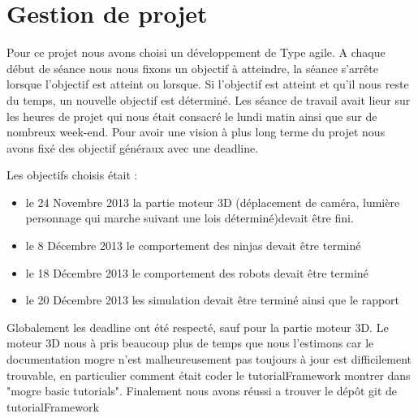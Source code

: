 \section{Gestion de projet}
\thispagestyle{fancy}
Pour ce projet nous avons choisi un développement de Type agile. A chaque début de séance nous nous fixons un objectif à atteindre, la séance s'arrête lorsque l'objectif est atteint ou lorsque. Si l'objectif est atteint et qu'il nous reste du temps, un nouvelle objectif est déterminé. Les séance de travail avait lieur sur les heures de projet qui nous était consacré le lundi matin ainsi que sur de nombreux week-end. Pour avoir une vision à plus long terme du projet nous avons fixé des objectif généraux avec une deadline. 

\noindent Les objectifs choisis était :
\begin{itemize}
\item le 24 Novembre 2013 la partie moteur 3D (déplacement de caméra, lumière personnage qui marche suivant une lois déterminé)devait être fini.
\item le 8 Décembre 2013 le comportement des ninjas devait être terminé
\item le 18 Décembre 2013 le comportement des robots devait être terminé
\item le 20 Décembre 2013 les simulation devait être terminé ainsi que le rapport
\end{itemize}

Globalement les deadline ont été respecté, sauf pour la partie moteur 3D. Le moteur 3D nous à pris beaucoup plus de temps que nous l'estimons car le documentation mogre n'est malheureusement pas toujours à jour est difficilement trouvable, en particulier comment était coder le tutorialFramework montrer dans "mogre basic tutorials". Finalement nous avons réussi a trouver le dépôt git de tutorialFramework

  